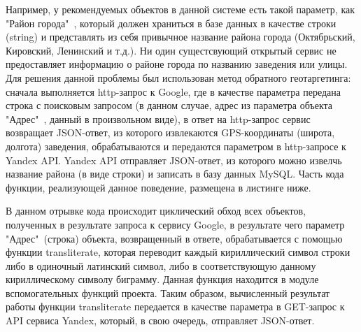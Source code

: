 Например, у рекомендуемых объектов в данной системе есть такой параметр, как "Район города"\ , который должен храниться в базе данных в качестве строки (string) и представлять из себя привычное название района города (Октябрьский, Кировский, Ленинский и т.д.). Ни один сущестсвующий открытый сервис не предоставляет информацию о районе города по названию заведения или улицы. Для решения данной проблемы был использован метод обратного геотаргетинга: сначала выполняется http-запрос к Google, где в качестве параметра передана строка с поисковым запросом (в данном случае, адрес из параметра объекта "Адрес"\ , данный в произвольном виде), в ответ на http-запрос сервис возвращает JSON-ответ, из которого извлекаются GPS-координаты (широта, долгота) заведения, обрабатываются и передаются параметром в http-запросе к Yandex API. Yandex API отправляет JSON-ответ, из которого можно извелчь название района (в виде строки) и записать в базу данных MySQL. Часть кода функции, реализующей данное поведение, размещена в листинге ниже.

В данном отрывке кода происходит циклический обход всех объектов, полученных в результате запроса к сервису Google, в результате чего параметр "Адрес"\ (строка) объекта, возвращенный в ответе, обрабатывается с помощью функции transliterate, которая переводит каждый кириллический символ строки либо в одиночный латинский символ, либо в соответствующую данному кириллическому символу биграмму. Данная функция находится в модуле вспомогательных функций проекта. Таким образом, вычисленный результат работы функции transliterate передается в качестве параметра в GET-запрос к API сервиса Yandex, который, в свою очередь, отправляет JSON-ответ. 

